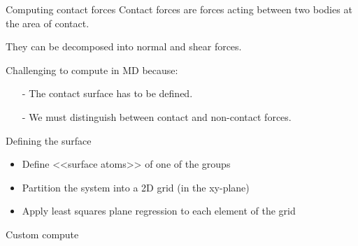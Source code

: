 \documentclass{beamer}
\begin{document}
\begin{frame}{Computing contact forces}
	Contact forces are forces acting between two bodies at the area of contact. 
	
	They can be decomposed into normal and shear forces.
	
	Challenging to compute in MD because:
	\begin{itemize}
		\item[-] The contact surface has to be defined.
		\item[-] We must distinguish between contact and non-contact forces.
	\end{itemize}
	
\end{frame}

\begin{frame}{Defining the surface}
	\begin{itemize}
		\item Define <<surface atoms>> of one of the groups
		\item Partition the system into a 2D grid (in the xy-plane)
		\item Apply least squares plane regression to each element of the grid
	\end{itemize}
\end{frame}

\begin{frame}{Custom compute}
	
\end{frame}
\end{document}
